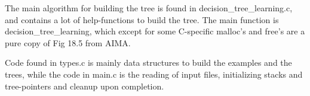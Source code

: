 \documentclass[english,a4paper]{scrartcl}
\begin{document}
The main algorithm for building the tree is found in {\ttfamily
decision\_tree\_learning.c}, and contains a lot of help-functions to build the
tree. The main function is {\ttfamily decision\_tree\_learning}, which except
for some C-specific malloc's and free's  are a pure copy of Fig 18.5 from AIMA.

Code found in {\ttfamily types.c} is mainly data structures to build the
examples and the trees, while the code in {\ttfamily main.c} is the reading of
input files, initializing stacks and tree-pointers and cleanup upon completion.
\end{document}
